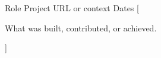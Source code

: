 

\begin{cventries}

  \cventry
    {Role} %
    {Project} %
    {URL or context} %
    {Dates} %
    [
      \begin{cvitems}
        \item {What was built, contributed, or achieved.}
      \end{cvitems}
    ]

\end{cventries}
